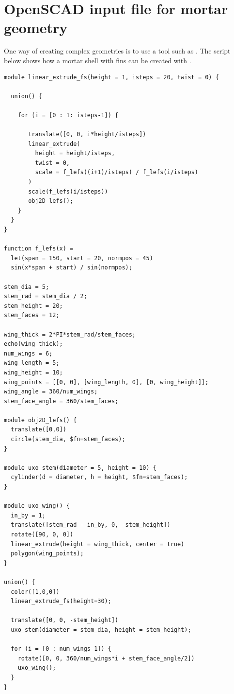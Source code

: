 \section{OpenSCAD input file for mortar geometry} \label{app:mesh}
One way of creating complex geometries is to use a tool such as .  The 
script below shows how a mortar shell with fins can be created with .
\begin{lstlisting}
module linear_extrude_fs(height = 1, isteps = 20, twist = 0) {

  union() {

    for (i = [0 : 1: isteps-1]) {

       translate([0, 0, i*height/isteps])
       linear_extrude(
         height = height/isteps,
         twist = 0,
         scale = f_lefs((i+1)/isteps) / f_lefs(i/isteps)
       )
       scale(f_lefs(i/isteps))
       obj2D_lefs();
    }
  }
}

function f_lefs(x) =
  let(span = 150, start = 20, normpos = 45)
  sin(x*span + start) / sin(normpos);

stem_dia = 5;
stem_rad = stem_dia / 2;
stem_height = 20;
stem_faces = 12;

wing_thick = 2*PI*stem_rad/stem_faces;
echo(wing_thick);
num_wings = 6;
wing_length = 5;
wing_height = 10;
wing_points = [[0, 0], [wing_length, 0], [0, wing_height]];
wing_angle = 360/num_wings;
stem_face_angle = 360/stem_faces;

module obj2D_lefs() {
  translate([0,0])
  circle(stem_dia, $fn=stem_faces);
}

module uxo_stem(diameter = 5, height = 10) {
  cylinder(d = diameter, h = height, $fn=stem_faces);
}

module uxo_wing() {
  in_by = 1;
  translate([stem_rad - in_by, 0, -stem_height])
  rotate([90, 0, 0])
  linear_extrude(height = wing_thick, center = true)
  polygon(wing_points);
}

union() {
  color([1,0,0])
  linear_extrude_fs(height=30);

  translate([0, 0, -stem_height])
  uxo_stem(diameter = stem_dia, height = stem_height);

  for (i = [0 : num_wings-1]) {
    rotate([0, 0, 360/num_wings*i + stem_face_angle/2])
    uxo_wing();
  }
}
\end{lstlisting}

